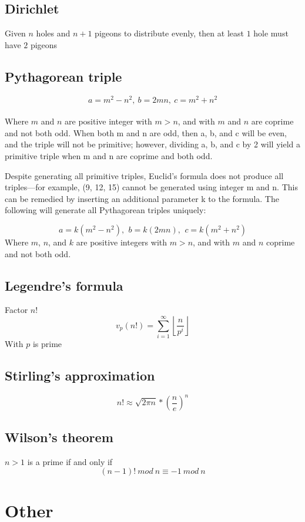\documentclass[A4 paper, 12pt, oneside, landscape]{article}
\begin{document}
\begin{multicols}{2}
	\subsection{Dirichlet}
	Given $n$ holes and $n + 1$ pigeons to distribute evenly, then at least $1$ hole must have $2$ pigeons
	
	\subsection{Pythagorean triple}
	\[a = m^2 - n^2, \ b = 2mn, \ c = m^2 + n^2 \] \\
	Where $m$ and $n$ are positive integer with $m > n$, and with $m$ and $n$ are coprime and not both odd. When both m and n are odd, then a, b, and c will be even, and the triple will not be primitive; however, dividing a, b, and c by 2 will yield a primitive triple when m and n are coprime and both odd.
	
	Despite generating all primitive triples, Euclid's formula does not produce all triples—for example, (9, 12, 15) cannot be generated using integer m and n. This can be remedied by inserting an additional parameter k to the formula. The following will generate all Pythagorean triples uniquely:

    \[a=k (m^{2}-n^{2}),\ \,b=k (2mn),\ \,c=k (m^{2}+n^{2}) \]
    Where $m$, $n$, and $k$ are positive integers with $m > n$, and with $m$ and $n$ coprime and not both odd.
	
	\subsection{Legendre's formula}
	Factor $n!$
	\[v_p(n!) = \sum_{i = 1}^{\infty} \left \lfloor \frac{n}{p ^ i} \right \rfloor \]
	With $p$ is prime
	
	\subsection{Stirling's approximation}
	\[n! \approx \sqrt{2\pi n} * (\frac{n}{e}) ^ n\]
	
	\subsection{Wilson's theorem}
	$n > 1$ is a prime if and only if 
	\[ (n - 1)! \ mod \ n \equiv -1 \ mod \ n \]

\section{Other}

\end{multicols}
\end{document}

